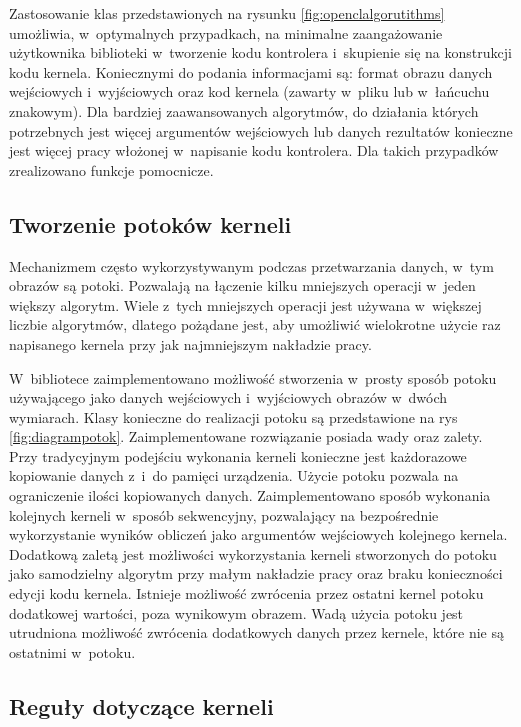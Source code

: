Zastosowanie klas przedstawionych na rysunku \ref{fig:openclalgorutithms} umożliwia, w~optymalnych przypadkach, na minimalne zaangażowanie użytkownika biblioteki w~tworzenie kodu kontrolera i~skupienie się na konstrukcji kodu kernela. Koniecznymi do podania informacjami są: format obrazu danych wejściowych i~wyjściowych oraz kod kernela (zawarty w~pliku lub w~łańcuchu znakowym). Dla bardziej zaawansowanych algorytmów, do działania których potrzebnych jest więcej argumentów wejściowych lub danych rezultatów konieczne jest więcej pracy włożonej w~napisanie kodu kontrolera. Dla takich przypadków zrealizowano funkcje pomocnicze.

\subsection{Tworzenie potoków kerneli}
\label{subsec:potokikerneli}

Mechanizmem często wykorzystywanym podczas przetwarzania danych, w~tym obrazów są potoki. Pozwalają na łączenie kilku mniejszych operacji w~jeden większy algorytm. Wiele z~tych mniejszych operacji jest używana w~większej liczbie algorytmów, dlatego pożądane jest, aby umożliwić wielokrotne użycie raz napisanego kernela przy jak najmniejszym nakładzie pracy.

W~bibliotece zaimplementowano możliwość stworzenia w~prosty sposób potoku używającego jako danych wejściowych i~wyjściowych obrazów w~dwóch wymiarach. Klasy konieczne do realizacji potoku są przedstawione na rys \ref{fig:diagrampotok}. Zaimplementowane rozwiązanie posiada wady oraz zalety. Przy tradycyjnym podejściu wykonania kerneli konieczne jest każdorazowe kopiowanie danych z~i~do pamięci urządzenia. Użycie potoku pozwala na ograniczenie ilości kopiowanych danych. Zaimplementowano sposób wykonania kolejnych kerneli w~sposób sekwencyjny, pozwalający na bezpośrednie wykorzystanie wyników obliczeń jako argumentów wejściowych kolejnego kernela. Dodatkową zaletą jest możliwości wykorzystania kerneli stworzonych do potoku jako samodzielny algorytm przy małym nakładzie pracy oraz braku konieczności edycji kodu kernela. Istnieje możliwość zwrócenia przez ostatni kernel potoku dodatkowej wartości, poza wynikowym obrazem. Wadą użycia potoku jest utrudniona możliwość zwrócenia dodatkowych danych przez kernele, które nie są ostatnimi w~potoku.

\subsection{Reguły dotyczące kerneli}
\label{subsec:regulykerneli}

